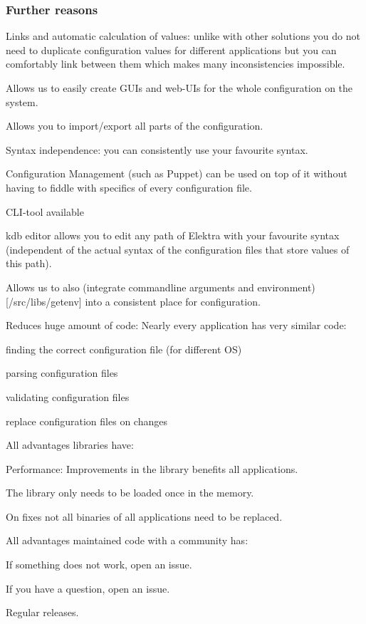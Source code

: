 \subsubsection*{Further reasons}


\begin{DoxyItemize}
\item Links and automatic calculation of values\+: unlike with other solutions you do not need to duplicate configuration values for different applications but you can comfortably link between them which makes many inconsistencies impossible.
\item Allows us to easily create G\+U\+Is and web-\/\+U\+Is for the whole configuration on the system.
\item Allows you to import/export all parts of the configuration.
\item Syntax independence\+: you can consistently use your favourite syntax.
\item Configuration Management (such as Puppet) can be used on top of it without having to fiddle with specifics of every configuration file.
\item C\+L\+I-\/tool available
\item {\ttfamily kdb editor} allows you to edit any path of Elektra with your favourite syntax (independent of the actual syntax of the configuration files that store values of this path).
\item Allows us to also (integrate commandline arguments and environment)\mbox{[}/src/libs/getenv\mbox{]} into a consistent place for configuration.
\item Reduces huge amount of code\+: Nearly every application has very similar code\+:
\begin{DoxyItemize}
\item finding the correct configuration file (for different O\+S)
\item parsing configuration files
\item validating configuration files
\item replace configuration files on changes
\end{DoxyItemize}
\item All advantages libraries have\+:
\begin{DoxyItemize}
\item Performance\+: Improvements in the library benefits all applications.
\item The library only needs to be loaded once in the memory.
\item On fixes not all binaries of all applications need to be replaced.
\end{DoxyItemize}
\item All advantages maintained code with a community has\+:
\begin{DoxyItemize}
\item If something does not work, open an issue.
\item If you have a question, open an issue.
\item Regular releases. 
\end{DoxyItemize}
\end{DoxyItemize}